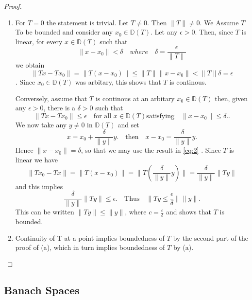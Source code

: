 \documentclass{article}
\theoremstyle{remark}
\begin{document}
\begin{proof}
  \begin{enumerate}
    \item  For $T = 0$ the statement is trivial. Let $T \neq 0$. Then $\|T\| \neq 0$. We Assume $T$ To be bounded and consider any $x_0 \in \mathbb{D}\left( T \right) $. Let any $\epsilon >  0$. Then, since $T$ is linear, for every $x \in \mathbb{D}\left(  T\right) $ such that 
      \[
      \|x - x_0\| < \delta \quad where \quad \delta = \frac{\epsilon}{\|T\|} 
      \] we obtain \[
      \|Tx- Tx_0\| = \|T\left( x - x_0 \right) \| \le \|T\| \|x - x_0\| < \|T\|\delta = \epsilon
    \]. Since $x_0 \in \mathbb{D}\left( T \right) $ was arbitary, this shows that $T$ is continous. 
    \par Conversely, assume that $T$ is continous at an arbitary $x_0 \in \mathbb{D}\left( T \right) $ then, given any $\epsilon > 0$, there is a $\delta > 0$ such that 
    \begin{equation}
    \label{eq:2}
      \|Tx- Tx_0\| \le \epsilon \quad \text{for all } x \in \mathbb{D}\left( T \right) \text{satisfying} \quad \|x- x_0\|\le \delta.       
    .\end{equation}
     We now take any $y \neq 0$ in $\mathbb{D}\left( T \right)  $ and set \[
    x = x_0+ \frac{\delta}{\|y\|} y. \quad \text{then} \quad x - x_0 = \frac{\delta}{\|y\|} y. 
  \]  Hence $\|x- x_0\| = \delta$,  so that we may use the result in \eqref{eq:2} . Since $T$ is linear we have  \[
  \| Tx_0 - Tx\| = \|T\left( x-x_0 \right)  \| =  \|T\left( \frac{\delta}{\|y\|}y \right) \| = \frac{\delta}{\|y\|} \|Ty\|
  \] and this implies \[
  \frac{\delta}{\|y\|}\|Ty\| \le \epsilon. \quad \text{Thus} \quad \|Ty \le \frac{\epsilon}{\delta}\|\|y\| 
  .\] This can be written $\|Ty\| \le  \|y\|$, where $c = \frac{\epsilon}{\delta}$ and shows that $T$ is bounded.  
\item Continuity of T at a point implies boundedness of $T$ by the second part of the proof of (a), which in turn implies boundedness of $T$ by (a).

  \end{enumerate}
\end{proof}

\subsection{Banach Spaces}%
\label{sub: Banach Spaces}
\end{document}
